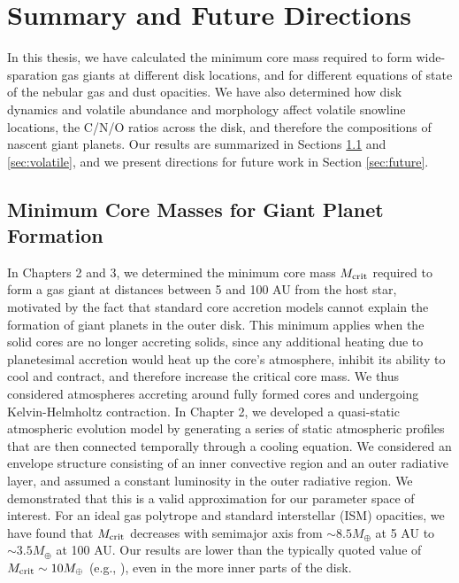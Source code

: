 \chapter{Summary and Future Directions}
\label{conclusion}

In this thesis, we have calculated the minimum core mass required to form wide-sparation gas giants at different disk locations, and for different equations of state of the nebular gas and dust opacities. We have also determined how disk dynamics and volatile abundance and morphology affect volatile snowline locations, the C/N/O ratios across the disk, and therefore the compositions of nascent giant planets. Our results are summarized in Sections \ref{sec:core} and \ref{sec:volatile}, and we present directions for future work in Section \ref{sec:future}. 

\section{Minimum Core Masses for Giant Planet Formation}
\label{sec:core}

In Chapters 2 and 3, we determined the minimum core mass $M_{\rm crit}$ required to form a gas giant at distances between 5 and 100 AU from the host star, motivated by the fact that standard core accretion models cannot explain the formation of giant planets in the outer disk. This minimum applies when the solid cores are no longer accreting solids, since any additional heating due to planetesimal accretion would heat up the core's atmosphere, inhibit its ability to cool and contract, and therefore increase the critical core mass. We thus considered atmospheres accreting around fully formed cores and undergoing Kelvin-Helmholtz contraction. In Chapter 2, we developed a quasi-static atmospheric evolution model by generating a series of static atmospheric profiles that are then connected temporally through a cooling equation. We considered an envelope structure consisting of an inner convective region and an outer radiative layer, and assumed a constant luminosity in the outer radiative region. We demonstrated that this is a valid approximation for our parameter space of interest. For an ideal gas polytrope and standard interstellar (ISM) opacities, we have found that $M_{\rm crit}$ decreases with semimajor axis from $\sim 8.5 M_{\oplus}$ at 5 AU to $\sim 3.5 M_{\oplus}$ at 100 AU. Our results are lower than the typically quoted value of $M_{\rm crit} \sim 10 M_{\oplus}$ (e.g., \citealt{rafikov06}), even in the more inner parts of the disk. 

